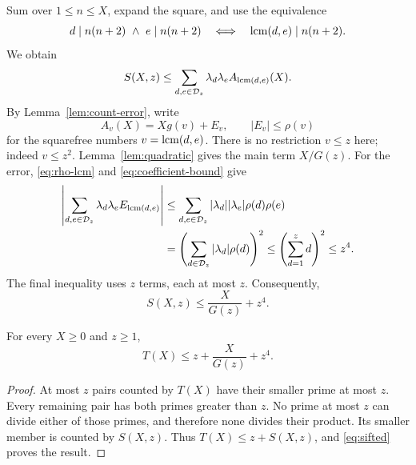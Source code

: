 Sum over \(1\le n\le X\), expand the square, and use the equivalence
\[
 d\mid n(n+2)\ \wedge\ e\mid n(n+2)
 \quad\Longleftrightarrow\quad
 \operatorname{lcm}(d,e)\mid n(n+2).
\]
We obtain
\[
 S(X,z)\le
 \sum_{d,e\in\mathcal D_z}\lambda_d\lambda_e A_{\operatorname{lcm}(d,e)}(X).
\]
By Lemma~\ref{lem:count-error}, write
\[
 A_v(X)=Xg(v)+E_v,\qquad |E_v|\le\rho(v)
\]
for the squarefree numbers \(v=\operatorname{lcm}(d,e)\).
There is no restriction \(v\le z\) here; indeed \(v\le z^2\).
Lemma~\ref{lem:quadratic} gives the main term \(X/G(z)\).
For the error, \eqref{eq:rho-lcm} and
\eqref{eq:coefficient-bound} give
\begin{align}
 \left|\sum_{d,e\in\mathcal D_z}\lambda_d\lambda_e E_{\operatorname{lcm}(d,e)}\right|
 &\le
 \sum_{d,e\in\mathcal D_z}|\lambda_d||\lambda_e|
                   \rho(d)\rho(e)\notag\\
 &=\left(\sum_{d\in\mathcal D_z}|\lambda_d|\rho(d)\right)^2
 \le\left(\sum_{d=1}^z d\right)^2
 \le z^4.
 \label{eq:sieve-error}
\end{align}
The final inequality uses \(z\) terms, each at most \(z\).
Consequently,
\begin{equation}
 S(X,z)\le\frac{X}{G(z)}+z^4.
 \label{eq:sifted}
\end{equation}

\begin{proposition}
\label{prop:finite-sieve}
For every \(X\ge0\) and \(z\ge1\),
\begin{equation}
 \boxed{\qquad
 T(X)\le z+\frac{X}{G(z)}+z^4.
 \qquad}
 \label{eq:finite-sieve}
\end{equation}
\end{proposition}

\begin{proof}
At most \(z\) pairs counted by \(T(X)\) have their smaller prime at most
\(z\). Every remaining pair has both primes greater than \(z\).
No prime at most \(z\) can divide either of those primes, and therefore
none divides their product. Its smaller member is counted by \(S(X,z)\).
Thus \(T(X)\le z+S(X,z)\), and \eqref{eq:sifted} proves the result.
\end{proof}
